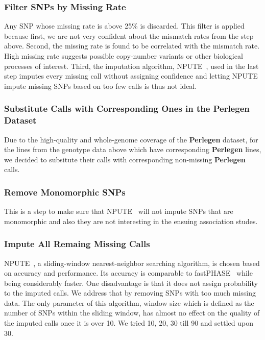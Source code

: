 \documentclass[a4paper,10pt]{article}
\begin{document}
\subsubsection{Filter SNPs by Missing Rate}
Any SNP whose missing rate is above 25\% is discarded. This filter is applied because first, we are not very confident about the mismatch rates from the step above. Second, the missing rate is found to be correlated with the mismatch rate. High missing rate suggests possible copy-number variants or other biological processes of interest. Third, the imputation algorithm, NPUTE~\cite{RobertsEtAl2007}, used in the last step imputes every missing call without assigning confidence and letting NPUTE impute missing SNPs based on too few calls is thus not ideal.

\subsubsection{Substitute Calls with Corresponding Ones in the \textbf{Perlegen} Dataset}
Due to the high-quality and whole-genome coverage of the \textbf{Perlegen} dataset, for the lines from the genotype data above which have corresponding \textbf{Perlegen} lines, we decided to subsitute their calls with corresponding non-missing \textbf{Perlegen} calls.

\subsubsection{Remove Monomorphic SNPs}
This is a step to make sure that NPUTE~\cite{RobertsEtAl2007} will not impute SNPs that are monomorphic and also they are not interesting in the ensuing association studes.
\subsubsection{Impute All Remaing Missing Calls}
NPUTE~\cite{RobertsEtAl2007}, a sliding-window nearest-neighbor searching algorithm, is chosen based on accuracy and performance. Its accuracy is comparable to fastPHASE~\cite{ScheetStephens2006} while being considerably faster. One disadvantage is that it does not assign probability to the imputed calls. We address that by removing SNPs with too much missing data. The only parameter of this algorithm, window size which is defined as the number of SNPs within the sliding window, has almost no effect on the quality of the imputed calls once it is over 10. We tried 10, 20, 30 till 90 and settled upon 30.
\end{document}
